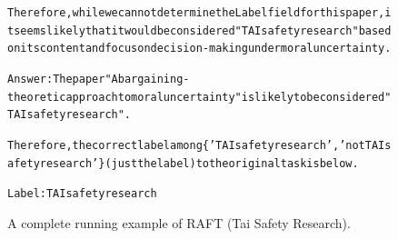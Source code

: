 \begin{figure}[t]
{{\begin{alltt}
Therefore, while we cannot determine the Label field for this paper, it seems likely that it would be considered "TAI safety research" based on its content and focus on decision-making under moral uncertainty.

Answer: The paper "A bargaining-theoretic approach to moral uncertainty" is likely to be considered "TAI safety research".

Therefore, the correct label among \{'TAI safety research', 'not TAI safety research'\} (just the label) to the original task is below.

Label: TAI safety research
\end{alltt}
}}
\caption{A complete running example of RAFT (Tai Safety Research).}
\label{fig:raft_subset=tai_safety_research_example}
\end{figure}
